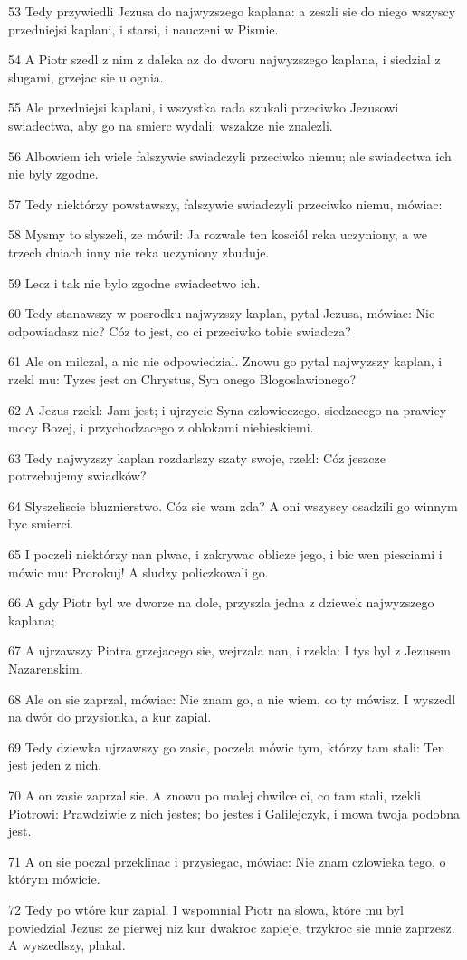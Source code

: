 \par 53 Tedy przywiedli Jezusa do najwyzszego kaplana: a zeszli sie do niego wszyscy przedniejsi kaplani, i starsi, i nauczeni w Pismie.
\par 54 A Piotr szedl z nim z daleka az do dworu najwyzszego kaplana, i siedzial z slugami, grzejac sie u ognia.
\par 55 Ale przedniejsi kaplani, i wszystka rada szukali przeciwko Jezusowi swiadectwa, aby go na smierc wydali; wszakze nie znalezli.
\par 56 Albowiem ich wiele falszywie swiadczyli przeciwko niemu; ale swiadectwa ich nie byly zgodne.
\par 57 Tedy niektórzy powstawszy, falszywie swiadczyli przeciwko niemu, mówiac:
\par 58 Mysmy to slyszeli, ze mówil: Ja rozwale ten kosciól reka uczyniony, a we trzech dniach inny nie reka uczyniony zbuduje.
\par 59 Lecz i tak nie bylo zgodne swiadectwo ich.
\par 60 Tedy stanawszy w posrodku najwyzszy kaplan, pytal Jezusa, mówiac: Nie odpowiadasz nic? Cóz to jest, co ci przeciwko tobie swiadcza?
\par 61 Ale on milczal, a nic nie odpowiedzial. Znowu go pytal najwyzszy kaplan, i rzekl mu: Tyzes jest on Chrystus, Syn onego Blogoslawionego?
\par 62 A Jezus rzekl: Jam jest; i ujrzycie Syna czlowieczego, siedzacego na prawicy mocy Bozej, i przychodzacego z oblokami niebieskiemi.
\par 63 Tedy najwyzszy kaplan rozdarlszy szaty swoje, rzekl: Cóz jeszcze potrzebujemy swiadków?
\par 64 Slyszeliscie bluznierstwo. Cóz sie wam zda? A oni wszyscy osadzili go winnym byc smierci.
\par 65 I poczeli niektórzy nan plwac, i zakrywac oblicze jego, i bic wen piesciami i mówic mu: Prorokuj! A sludzy policzkowali go.
\par 66 A gdy Piotr byl we dworze na dole, przyszla jedna z dziewek najwyzszego kaplana;
\par 67 A ujrzawszy Piotra grzejacego sie, wejrzala nan, i rzekla: I tys byl z Jezusem Nazarenskim.
\par 68 Ale on sie zaprzal, mówiac: Nie znam go, a nie wiem, co ty mówisz. I wyszedl na dwór do przysionka, a kur zapial.
\par 69 Tedy dziewka ujrzawszy go zasie, poczela mówic tym, którzy tam stali: Ten jest jeden z nich.
\par 70 A on zasie zaprzal sie. A znowu po malej chwilce ci, co tam stali, rzekli Piotrowi: Prawdziwie z nich jestes; bo jestes i Galilejczyk, i mowa twoja podobna jest.
\par 71 A on sie poczal przeklinac i przysiegac, mówiac: Nie znam czlowieka tego, o którym mówicie.
\par 72 Tedy po wtóre kur zapial. I wspomnial Piotr na slowa, które mu byl powiedzial Jezus: ze pierwej niz kur dwakroc zapieje, trzykroc sie mnie zaprzesz. A wyszedlszy, plakal.


